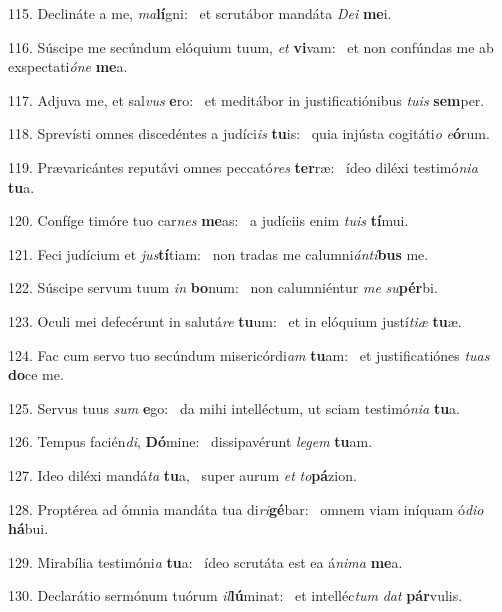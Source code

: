 115. Declináte a me, \textit{ma}\textbf{lí}gni: \ast\  et scrutábor mandáta \textit{De}\textit{i} \textbf{me}i.\

116. Súscipe me secúndum elóquium tuum, \textit{et} \textbf{vi}vam: \ast\  et non confúndas me ab exspectati\textit{ó}\textit{ne} \textbf{me}a.\

117. Adjuva me, et sal\textit{vus} \textbf{e}ro: \ast\  et meditábor in justificatiónibus \textit{tu}\textit{is} \textbf{sem}per.\

118. Sprevísti omnes discedéntes a judíci\textit{is} \textbf{tu}is: \ast\  quia injústa cogitáti\textit{o} \textit{e}\textbf{ó}rum.\

119. Prævaricántes reputávi omnes peccató\textit{res} \textbf{ter}ræ: \ast\  ídeo diléxi testimó\textit{ni}\textit{a} \textbf{tu}a.\

120. Confíge timóre tuo car\textit{nes} \textbf{me}as: \ast\  a judíciis enim \textit{tu}\textit{is} \textbf{tí}mui.\

121. Feci judícium et \textit{jus}\textbf{tí}tiam: \ast\  non tradas me calumni\textit{án}\textit{ti}\textbf{bus} me.\

122. Súscipe servum tuum \textit{in} \textbf{bo}num: \ast\  non calumniéntur \textit{me} \textit{su}\textbf{pér}bi.\

123. Oculi mei defecérunt in salutá\textit{re} \textbf{tu}um: \ast\  et in elóquium justí\textit{ti}\textit{æ} \textbf{tu}æ.\

124. Fac cum servo tuo secúndum misericórdi\textit{am} \textbf{tu}am: \ast\  et justificatiónes \textit{tu}\textit{as} \textbf{do}ce me.\

125. Servus tuus \textit{sum} \textbf{e}go: \ast\  da mihi intelléctum, ut sciam testimó\textit{ni}\textit{a} \textbf{tu}a.\

126. Tempus facién\textit{di}, \textbf{Dó}mine: \ast\  dissipavérunt \textit{le}\textit{gem} \textbf{tu}am.\

127. Ideo diléxi mandá\textit{ta} \textbf{tu}a, \ast\  super aurum \textit{et} \textit{to}\textbf{pá}zion.\

128. Proptérea ad ómnia mandáta tua di\textit{ri}\textbf{gé}bar: \ast\  omnem viam iníquam ó\textit{di}\textit{o} \textbf{há}bui.\

129. Mirabília testimóni\textit{a} \textbf{tu}a: \ast\  ídeo scrutáta est ea á\textit{ni}\textit{ma} \textbf{me}a.\

130. Declarátio sermónum tuórum \textit{il}\textbf{lú}minat: \ast\  et intelléc\textit{tum} \textit{dat} \textbf{pár}vulis.\

